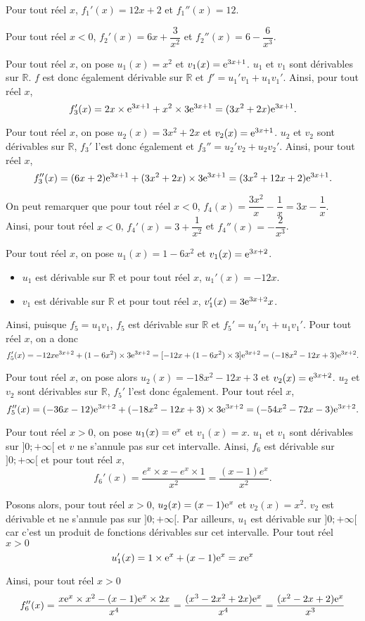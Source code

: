 \documentclass[11pt,fleqn, openany]{book} %
\begin{document}
\begin{solution}Pour tout réel $x$, $f_1'(x)=12x+2$ et $f_1''(x)=12$.

Pour tout réel $x<0$, $f_2'(x)=6x+\dfrac{3}{x^2}$ et $f_2''(x)=6-\dfrac{6}{x^3}$.

Pour tout réel $x$, on pose $u_1(x)=x^2$ et $v_1(x)=\mathrm{e}^{3x+1}$. $u_1$ et $v_1$ sont dérivables sur $\mathbb{R}$. $f$ est donc également dérivable sur $\mathbb{R}$ et $f'=u_1'v_1+u_1v_1'$. Ainsi, pour tout réel $x$,
\[ f_3'(x)= 2x \times \mathrm{e}^{3x+1} + x^2 \times 3\mathrm{e}^{3x+1} = (3x^2+2x)\mathrm{e}^{3x+1}.\]

Pour tout réel $x$, on pose $u_2(x)=3x^2+2x$ et $v_2(x)=\mathrm{e}^{3x+1}$. $u_2$ et $v_2$ sont dérivables sur $\mathbb{R}$, $f_3'$ l'est donc également et $f_3''=u_2'v_2+u_2v_2'$. Ainsi, pour tout réel $x$,
\[f_3''(x)=(6x+2)\mathrm{e}^{3x+1}+(3x^2+2x)\times 3\mathrm{e}^{3x+1}=(3x^2+12x+2)\mathrm{e}^{3x+1}.\]

On peut remarquer que pour tout réel $x<0$, $f_4(x)=\dfrac{3x^2}{x}-\dfrac{1}{x}=3x-\dfrac{1}{x}$. \\Ainsi, pour tout réel $x<0$, $f_4'(x)=3+\dfrac{1}{x^2}$ et $f_4''(x)=-\dfrac{2}{x^3}$.

Pour tout réel $x$, on pose $u_1(x)=1-6x^2$ et $v_1(x)=\mathrm{e}^{3x+2}$.
\begin{itemize}
\item $u_1$ est dérivable sur $\mathbb{R}$ et pour tout réel $x$, $u_1'(x)=-12x$.
\item $v_1$ est dérivable sur $\mathbb{R}$ et pour tout réel $x$, $v_1'(x)=3\mathrm{e}^{3x+2}x$.
\end{itemize}
Ainsi, puisque $f_5=u_1v_1$, $f_5$ est dérivable sur $\mathbb{R}$ et $f_5'=u_1'v_1+u_1v_1'$. Pour tout réel $x$, on a donc
\[ f_5'(x)=-12x\mathrm{e}^{3x+2}+(1-6x^2)\times 3\mathrm{e}^{3x+2}=[-12x+(1-6x^2)\times 3] \mathrm{e}^{3x+2}=(-18x^2-12x+3)\mathrm{e}^{3x+2}.\]

Pour tout réel $x$, on pose alors $u_2(x)=-18x^2-12x+3$ et $v_2(x)=\mathrm{e}^{3x+2}$. $u_2$ et $v_2$ sont dérivables sur $\mathbb{R}$, $f_5'$ l'est donc également. Pour tout réel $x$,
\[ f_5''(x)= (-36x-12)\mathrm{e}^{3x+2} + (-18x^2-12x+3) \times 3\mathrm{e}^{3x+2}=(-54x^2-72x-3)\mathrm{e}^{3x+2}.\]

Pour tout réel $x>0$, on pose $u_1(x)=\mathrm{e}^x$ et $v_1(x)=x$. $u_1$ et $v_1$ sont dérivables sur $]0;+\infty[$ et $v$ ne s'annule pas sur cet intervalle. Ainsi, $f_6$ est dérivable sur $]0;+\infty[$ et pour tout réel $x$,
\[ f_6'(x)= \dfrac{e^x \times x - e^x \times 1}{x^2}=\dfrac{(x-1)e^x}{x^2}.\]

Posons alors, pour tout réel $x>0$, $u_2(x)=(x-1)\mathrm{e}^x$ et $v_2(x)=x^2$. $v_2$ est dérivable et ne s'annule pas sur $]0;+\infty[$. Par ailleurs, $u_1$ est dérivable sur $]0;+\infty[$ car c'est un produit de fonctions dérivables sur cet intervalle. Pour tout réel $x>0$
\[ u_1'(x)= 1 \times \mathrm{e}^x + (x-1)\mathrm{e}^x =x\mathrm{e}^x\]

Ainsi, pour tout réel $x>0$
\[ f_6''(x)=\dfrac{x\mathrm{e}^x \times x^2-(x-1)\mathrm{e}^x \times 2x}{x^4}=\dfrac{(x^3-2x^2+2x)\mathrm{e}^x}{x^4}=\dfrac{(x^2-2x+2)\mathrm{e}^x}{x^3}\]
\newpage
\end{solution}
\end{document}
